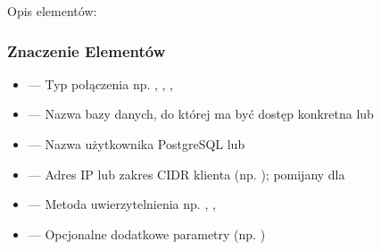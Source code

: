 \documentclass[letterpaper,10pt,polish]{sphinxmanual}
\begin{document}
\begin{sphinxVerbatim}[commandchars=\\\{\}]
           \PYG{p}{[}\PYG{p}{]}
\end{sphinxVerbatim}

\sphinxAtStartPar
Opis elementów:


\subsubsection{Znaczenie Elementów}
\label{\detokenize{rozdzial2/bezpieczenstwo/index:znaczenie-elementow}}\begin{itemize}
\item {} 
\sphinxAtStartPar
{} — Typ połączenia \textendash{} np. , , , 

\item {} 
\sphinxAtStartPar
{} — Nazwa bazy danych, do której ma być dostęp \textendash{} konkretna lub 

\item {} 
\sphinxAtStartPar
{} — Nazwa użytkownika PostgreSQL lub 

\item {} 
\sphinxAtStartPar
{} — Adres IP lub zakres CIDR klienta (np. ); pomijany dla 

\item {} 
\sphinxAtStartPar
{} — Metoda uwierzytelnienia \textendash{} np. , , 

\item {} 
\sphinxAtStartPar
\sphinxcode{\sphinxupquote{{[}opcje{]}}} — Opcjonalne dodatkowe parametry (np. )

\end{itemize}
\end{document}
